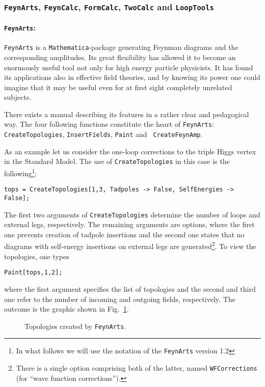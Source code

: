 
\subsubsection{{\tt FeynArts}, {\tt FeynCalc}, {\tt FormCalc}, 
  {\tt TwoCalc} and {\tt LoopTools}}
%
\paragraph{{\tt FeynArts}:}
%
{\tt FeynArts} is a {\tt Mathematica}-package generating Feynman
diagrams and the corresponding amplitudes. Its great flexibility has
allowed it to become an enormously useful tool not only for high energy
particle physicists. It has found its applications also in effective
field theories, and by knowing its power one could imagine that it may
be useful even for at first sight completely unrelated subjects.

There exists a manual describing its features in a rather
clear and pedagogical way. The four following functions constitute the
heart of {\tt FeynArts}: 
{\tt CreateTopologies}, {\tt InsertFields}, {\tt Paint} and {\tt
  CreateFeynAmp}.

As an example let us consider the one-loop corrections to the
triple Higgs vertex in the Standard Model.
The use of {\tt CreateTopologies} in this case is the following\footnote{In
  what follows we will use the notation of the {\tt FeynArts} version 1.2}:
\begin{verbatim}
tops = CreateTopologies[1,3, Tadpoles -> False, SelfEnergies -> False];
\end{verbatim}
The first two arguments of {\tt CreateTopologies} determine the number
of loops and external legs, respectively. The remaining arguments are
options, where the first one prevents creation of tadpole insertions and
the second one states that no diagrams with self-energy insertions on
external legs are generated\footnote{ 
  There is a single option
  comprising both of the latter, named {\tt WFCorrections} (for ``wave
  function corrections'').}.  To view the topologies, one types
\begin{verbatim}
Paint[tops,1,2];
\end{verbatim}
where the first argument specifies the list of topologies and the second
and third one refer to the number of incoming and outgoing fields,
respectively. The outcome is the graphic shown in Fig.~\ref{FAtops1l.ps}.
%
\begin{figure}[ht]
  \begin{center}
    \leavevmode
    \hfill
    \parbox{\captionwidth}{
    \caption[]{\label{FAtops1l.ps}\sloppy
      Topologies created by {\tt FeynArts}.
      }}
  \end{center}
\end{figure}
%

